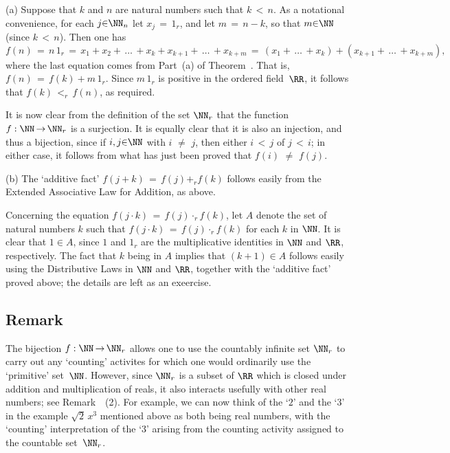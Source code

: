         (a) Suppose that $k$ and $n$ are natural numbers such that $k\,<\,n$. As a notational convenience,
    for each $j{\in}{\NN}_{n}$ let $x_{j} \,=\, 1_{r}$, and let $m \,=\, n-k$, so that $m{\in}{\NN}$ (since $k\,<\,n$). Then one has
        \begin{displaymath}
        f(n) \,=\, n\,1_{r}
    \,=\, 
        x_{1} + x_{2} + \,{\ldots}\, + x_{k} + x_{k+1} + \,{\ldots}\,+x_{k+m}
     \,=\, 
        (x_{1} + \,{\ldots}\, + x_{k}) + (x_{k+1} + \,{\ldots}\, + x_{k+m}),
        \end{displaymath}
    where the last equation comes from Part~(a) of Theorem~. That is, $f(n) \,=\, f(k) + m\,1_{r}$.
    Since $m\,1_{r}$ is positive in the ordered field~${\RR}$, it follows that $f(k)\,<_{r}\,f(n)$, as required.

        It is now clear from the definition of the set ${\NN}_{r}$ that the function $f:{\NN} \,{\rightarrow}\, {\NN}_{r}$ is a surjection.
    It is equally clear that it is also an injection, and thus a bijection, since if $i,j{\in}{\NN}$ with $i \,\,{\neq}\,\, j$,
    then either $i\,<\,j$ of $j\,<\,i$; in either case, it follows from what has just been proved that $f(i) \,\,{\neq}\,\, f(j)$.

\V

        (b) The `additive fact' $f(j+k) \,=\, f(j) +_{r} f(k)$ follows easily from the Extended Associative Law for Addition, as above.

    Concerning the equation $f(j{\cdot}k) \,=\, f(j){\cdot}_{r}f(k)$, let $A$ denote the set of natural numbers $k$
    such that $f(j{\cdot}k) \,=\, f(j){\cdot}_{r}f(k)$ for each $k$ in ${\NN}$. It is clear that $1{\in}A$,
    since $1$ and $1_{r}$ are the multiplicative identities in ${\NN}$ and ${\RR}$, respectively.
    The fact that $k$ being in $A$ implies that $(k+1){\in}A$ follows easily using the Distributive Laws in ${\NN}$ and ${\RR}$,
    together with the `additive fact' proved above; the details are left as an exeercise. %


\V
\V

        \subsection{\small{{\bf Remark}}}
        \label{RemrkB25.30}

\V

\hspace*{\parindent} The bijection $f:{\NN} \,{\rightarrow}\, {\NN}_{r}$ allows one to use
    the countably infinite set ${\NN}_{r}$ to carry out any `counting' activites for which one would ordinarily use the `primitive' set~${\NN}$.
    However, since ${\NN}_{r}$ is a subset of ${\RR}$ which is closed under addition and multiplication of reals,
    it also interacts usefully with other real numbers; see Remark~~(2).
    For example, we can now think of the `$2$' and the `$3$' in the example $\sqrt{2}\,x^{3}$ mentioned above as both being real numbers,
    with the `counting' interpretation of the `$3$' arising from the counting activity assigned to the countable set~${\NN}_{r}$.

